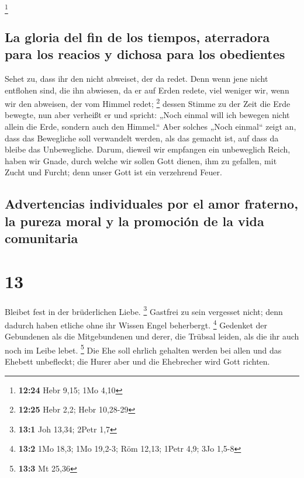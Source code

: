 \footnote{\textbf{12:24} Hebr 9,15; 1Mo 4,10}

\hypertarget{la-gloria-del-fin-de-los-tiempos-aterradora-para-los-reacios-y-dichosa-para-los-obedientes}{%
\subsection{La gloria del fin de los tiempos, aterradora para los
reacios y dichosa para los
obedientes}\label{la-gloria-del-fin-de-los-tiempos-aterradora-para-los-reacios-y-dichosa-para-los-obedientes}}

 Sehet zu, dass ihr den nicht abweiset, der da redet.
Denn wenn jene nicht entflohen sind, die ihn abwiesen, da er auf Erden
redete, viel weniger wir, wenn wir den abweisen, der vom Himmel redet;
\footnote{\textbf{12:25} Hebr 2,2; Hebr 10,28-29}  dessen
Stimme zu der Zeit die Erde bewegte, nun aber verheißt er und spricht:
„Noch einmal will ich bewegen nicht allein die Erde, sondern auch den
Himmel.``  Aber solches „Noch einmal`` zeigt an, dass das
Bewegliche soll verwandelt werden, als das gemacht ist, auf dass da
bleibe das Unbewegliche.  Darum, dieweil wir empfangen
ein unbeweglich Reich, haben wir Gnade, durch welche wir sollen Gott
dienen, ihm zu gefallen, mit Zucht und Furcht;  denn
unser Gott ist ein verzehrend Feuer.

\hypertarget{advertencias-individuales-por-el-amor-fraterno-la-pureza-moral-y-la-promociuxf3n-de-la-vida-comunitaria}{%
\subsection{Advertencias individuales por el amor fraterno, la pureza
moral y la promoción de la vida
comunitaria}\label{advertencias-individuales-por-el-amor-fraterno-la-pureza-moral-y-la-promociuxf3n-de-la-vida-comunitaria}}

\hypertarget{section-12}{%
\section{13}\label{section-12}}

 Bleibet fest in der brüderlichen Liebe. \footnote{\textbf{13:1}
  Joh 13,34; 2Petr 1,7}  Gastfrei zu sein vergesset nicht;
denn dadurch haben etliche ohne ihr Wissen Engel beherbergt. \footnote{\textbf{13:2}
  1Mo 18,3; 1Mo 19,2-3; Röm 12,13; 1Petr 4,9; 3Jo 1,5-8} 
Gedenket der Gebundenen als die Mitgebundenen und derer, die Trübsal
leiden, als die ihr auch noch im Leibe lebet. \footnote{\textbf{13:3} Mt
  25,36}  Die Ehe soll ehrlich gehalten werden bei allen
und das Ehebett unbefleckt; die Hurer aber und die Ehebrecher wird Gott
richten.

